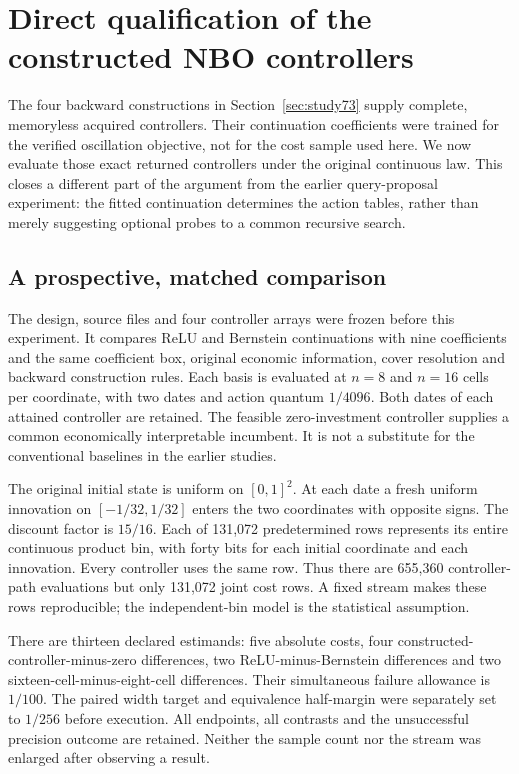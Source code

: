 \section{Direct qualification of the constructed NBO controllers}\label{sec:study75}
The four backward constructions in Section~\ref{sec:study73} supply complete, memoryless acquired controllers. Their continuation coefficients were trained for the verified oscillation objective, not for the cost sample used here. We now evaluate those exact returned controllers under the original continuous law. This closes a different part of the argument from the earlier query-proposal experiment: the fitted continuation determines the action tables, rather than merely suggesting optional probes to a common recursive search.

\subsection{A prospective, matched comparison}
The design, source files and four controller arrays were frozen before this experiment. It compares ReLU and Bernstein continuations with nine coefficients and the same coefficient box, original economic information, cover resolution and backward construction rules. Each basis is evaluated at $n=8$ and $n=16$ cells per coordinate, with two dates and action quantum $1/4096$. Both dates of each attained controller are retained. The feasible zero-investment controller supplies a common economically interpretable incumbent. It is not a substitute for the conventional baselines in the earlier studies.

The original initial state is uniform on $[0,1]^2$. At each date a fresh uniform innovation on $[-1/32,1/32]$ enters the two coordinates with opposite signs. The discount factor is $15/16$. Each of 131,072 predetermined rows represents its entire continuous product bin, with forty bits for each initial coordinate and each innovation. Every controller uses the same row. Thus there are 655,360 controller-path evaluations but only 131,072 joint cost rows. A fixed stream makes these rows reproducible; the independent-bin model is the statistical assumption.

There are thirteen declared estimands: five absolute costs, four constructed-controller-minus-zero differences, two ReLU-minus-Bernstein differences and two sixteen-cell-minus-eight-cell differences. Their simultaneous failure allowance is $1/100$. The paired width target and equivalence half-margin were separately set to $1/256$ before execution. All endpoints, all contrasts and the unsuccessful precision outcome are retained. Neither the sample count nor the stream was enlarged after observing a result.

